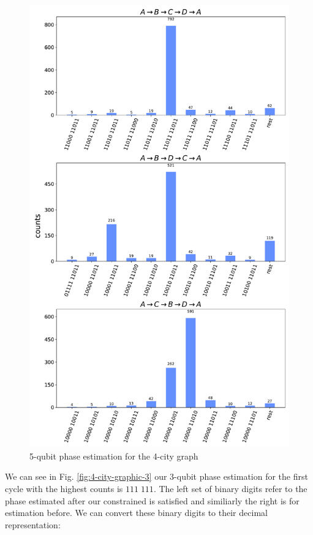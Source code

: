 \documentclass[msc,oneside]{ubcthesis}
\begin{document}
		\begin{figure}[!h]
		\centering
		\includegraphics[width=\textwidth,height=0.9\textheight,keepaspectratio]{"graphics/5qubit-4city"}
		\caption{5-qubit phase estimation for the 4-city graph}
		\label{fig:4-city-graphic-5}
	\end{figure}		
	
 We can see in Fig. \ref{fig:4-city-graphic-3} our 3-qubit phase estimation for the first cycle with the highest counts is $111\; 111$. The left set of binary digits refer to the phase estimated after our constrained is satisfied and similiarly the right is for estimation before. We can convert these binary digits to their decimal representation: 
 
\end{document}
